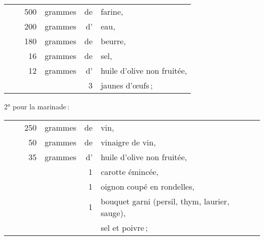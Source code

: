 \footnotesize
\begin{longtable}{rrrrrp{18em}}
  & \hspace{2em} &  500 & grammes & de & farine,                                                          \\
  & \hspace{2em} &  200 & grammes & d' & eau,                                                             \\
  & \hspace{2em} &  180 & grammes & de & beurre,                                                          \\
  & \hspace{2em} &   16 & grammes & de & sel,                                                             \\
  & \hspace{2em} &   12 & grammes & d' & huile d'olive non fruitée,                                       \\
  & \hspace{2em} &      &         &  3 & jaunes d'œufs ;                                                  \\
\end{longtable}
\normalsize

\label{pg0669} \hypertarget{p0669}{}
2° pour la marinade :

\footnotesize
\begin{longtable}{rrrrrp{18em}}
  & \hspace{2em} &  250 & grammes & de & vin,                                                             \\
  & \hspace{2em} &   50 & grammes & de & vinaigre de vin,                                                 \\
  & \hspace{2em} &   35 & grammes & d' & huile d'olive non fruitée,                                       \\
  & \hspace{2em} &      &         &  1 & carotte émincée,                                                 \\
  & \hspace{2em} &      &         &  1 & oignon coupé en rondelles,                                       \\
  & \hspace{2em} &      &         &  1 & bouquet garni (persil, thym, laurier, sauge),                    \\
  & \hspace{2em} &      &         &    & sel et poivre ;                                                  \\
\end{longtable}
\normalsize


